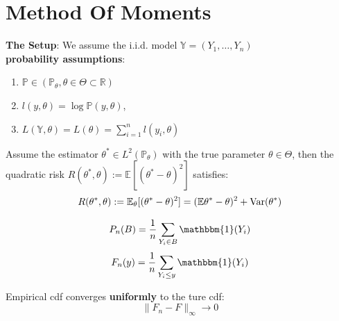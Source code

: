 \section{Method Of Moments}
\textbf{The Setup}: We assume the i.i.d. model $\mathbb{Y} = (Y_1, \dots, Y_n)$\\
\textbf{probability assumptions}:
\begin{enumerate}
	\item $\mathbb{P} \in (\mathbb{P}_\theta, \theta \in \Theta \subset \mathbb{R})$
	\item $l(y, \theta) = \log \mathbb{P}(y, \theta)$, 
	\item $L(\mathbb{Y}, \theta) = L(\theta) = \sum_{i = 1}^n l(y_i, \theta)$
\end{enumerate} 


\begin{theorem}
	Assume the estimator $\theta^* \in L^2(\mathbb{P}_\theta)$ with the true parameter $\theta \in \Theta$, then the quadratic risk $R(\theta^*, \theta):= \mathbb{E}[(\theta^* - \theta)^2]$ satisfies:
	\begin{align*}
		R(\theta^*, \theta) := \mathbb{E}_\theta[(\theta^* - \theta)^2] =  (\mathbb{E}\theta^* - \theta)^2 + \operatorname{Var}(\theta^*)
	\end{align*}
\end{theorem}
\begin{definition}
\begin{equation*}
	P_n(B) = \frac{1}{n} \sum_{Y_i \in B}\mathbbm{1}(Y_i)
\end{equation*}
\begin{equation*}
	F_n(y) = \frac{1}{n} \sum_{Y_i \leq y} \mathbbm{1}(Y_i)
\end{equation*}
	
\end{definition}


\begin{theorem}
	Empirical cdf converges \textbf{uniformly }to the ture cdf:
	\begin{equation*}
		\|F_n - F\|_\infty \rightarrow0
	\end{equation*}
\end{theorem}

